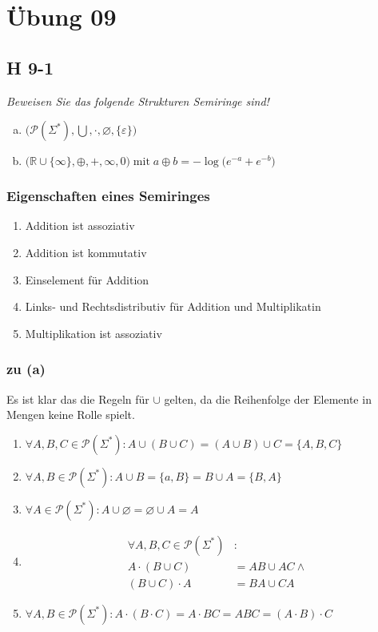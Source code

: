 \documentclass{scrartcl}
\begin{document}
\section{Übung 09}

\subsection{H 9-1}

\textsl{Beweisen Sie das folgende Strukturen \emph{Semiringe} sind!}

\begin{enumerate}[(a)]
    \item $\Big(\mathcal{P}(\Sigma^*), \bigcup, \cdot, \varnothing, \{\varepsilon\} \Big)$
    \item $\Big(\mathbb{R} \cup \{\infty\}, \oplus, +, \infty, 0 \Big) \;\text{mit}\; a \oplus b = -\log\big(e^{-a}+e^{-b}\big)$
\end{enumerate}

\subsubsection{Eigenschaften eines Semiringes}
\begin{enumerate}
    \setlength\itemsep{-1em}
    \item Addition ist assoziativ
    \item Addition ist kommutativ
    \item Einselement für Addition
    \item Links- und Rechtsdistributiv für Addition und Multiplikatin
    \item Multiplikation ist assoziativ
\end{enumerate}

\subsubsection{zu (a)}

\newcommand{\baseset}{\mathcal{P}(\Sigma^*)}
Es ist klar das die Regeln für $\cup$ gelten, da die Reihenfolge der Elemente in Mengen keine Rolle spielt.
\begin{enumerate}
    \item $\forall A, B, C \in \baseset: A \cup (B \cup C) = (A \cup B) \cup C = \{A, B, C\}$
    \item $\forall A, B \in \baseset: A \cup B = \{a, B\} = B \cup A = \{B, A\}$
    \item $\forall A \in \baseset: A \cup \varnothing = \varnothing \cup A = A$
    \item \begin{align*}
        \forall A, B, C \in \baseset&:\\
            A \cdot (B \cup C) &= AB \cup AC \land\\
            (B \cup C) \cdot A &= BA \cup CA
    \end{align*}
    \item $\forall A, B \in \baseset: A \cdot (B \cdot C) = A \cdot BC = ABC = (A \cdot B) \cdot C$
\end{enumerate}
\end{document}
